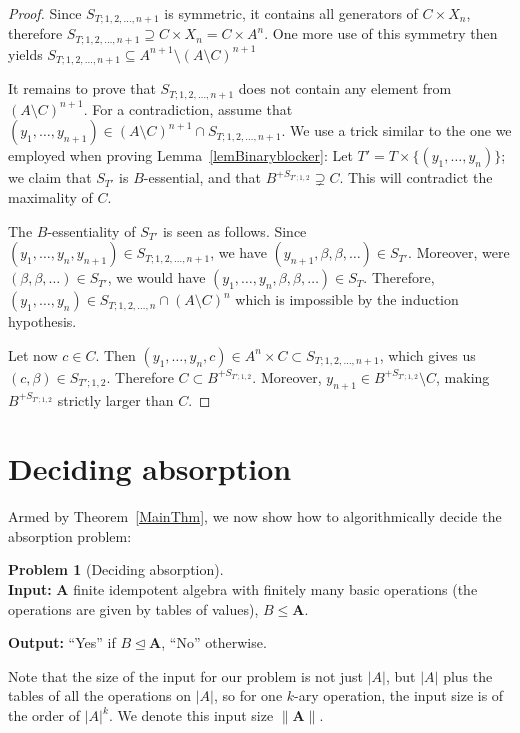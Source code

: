 \documentclass{amsart}
\theoremstyle{plain}
\theoremstyle{definition}
\newtheorem{problem}[theorem]{Problem}
\begin{document}
\begin{proof}
Since $S_{T;1,2,\dots,n+1}$ is symmetric, it contains all generators of $C\times
X_n$, therefore  $S_{T;1,2,\dots,n+1}\supseteq C\times X_n=C\times
A^n$. One more use of this symmetry then yields $S_{T;1,2,\dots,n+1}\subseteq A^{n+1}\setminus(A\setminus C)^{n+1}$

It remains to prove that $S_{T;1,2,\dots,n+1}$ does not contain any element
from $(A\setminus C)^{n+1}$. For a contradiction, assume that $(y_1,\dots,y_{n+1})\in (A\setminus
C)^{n+1}\cap S_{T;1,2,\dots,n+1}$. We use a trick similar to the one we employed when proving Lemma~\ref{lemBinaryblocker}:
Let $T'=T\times\{(y_1,\dots,y_n)\}$; we claim that $S_{T'}$ is $B$-essential,
and that $B^{+S_{T';1,2}}\supsetneq C$. This will contradict the maximality of $C$.

The $B$-essentiality of $S_{T'}$ is seen as follows. Since $(y_1,\dots,y_n,y_{n+1})\in
S_{T;1,2,\dots,n+1}$, we have $(y_{n+1},\beta,\beta,\dots)\in S_{T'}$. Moreover, were
$(\beta,\beta,\dots)\in S_{T'}$, we would have $(y_1,\dots,y_{n},\beta,\beta,\dots)\in S_T.$ Therefore, $(y_1,\dots,y_n)\in
S_{T;1,2,\dots,n}\cap (A\setminus C)^n$ which is impossible by the induction hypothesis.

Let now $c\in C$. Then $(y_1,\dots,y_n,c)\in A^n\times C\subset
S_{T;1,2,\dots,n+1}$, which gives us $(c,\beta)\in S_{T';1,2}$. Therefore $C\subset B^{+S_{T';1,2}}$.
Moreover, $y_{n+1}\in B^{+S_{T';1,2}}\setminus C$, making $B^{+S_{T';1,2}}$ strictly
larger than $C$.
\end{proof}

\section{Deciding absorption}
\label{secDeciding}
Armed by Theorem~\ref{MainThm}, we now show how to algorithmically
decide the absorption problem:

\begin{problem}[Deciding absorption]\ \\
{\bf Input:} ${{\mathbf{A}}}$ finite idempotent algebra with finitely many basic operations (the operations are
given by tables of values), $B\leq {{\mathbf{A}}}$.

\noindent
{\bf Output:} ``Yes'' if $B\operatorname{\trianglelefteq} {{\mathbf{A}}}$, ``No'' otherwise.
\end{problem}

Note that the size of the
input for our problem is not just $|A|$, but $|A|$ plus the tables of all the
operations on $|A|$, so for one $k$-ary operation, the input size is of the
order of $|A|^k$. We denote this input size $\|{{\mathbf{A}}}\|$.
\end{document}
